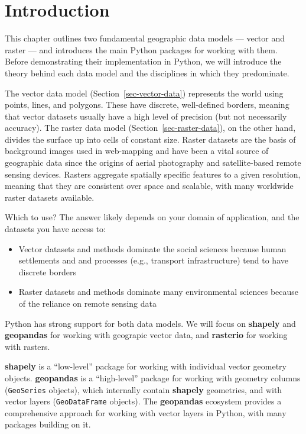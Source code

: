 \documentclass[
  letterpaper,
]{krantz}
\providecommand{\tightlist}{%
  \setlength{\itemsep}{0pt}\setlength{\parskip}{0pt}}\usepackage{longtable,booktabs,array}
\begin{document}
\section{Introduction}\label{introduction}

This chapter outlines two fundamental geographic data models --- vector
and raster --- and introduces the main Python packages for working with
them. Before demonstrating their implementation in Python, we will
introduce the theory behind each data model and the disciplines in which
they predominate.

The vector data model (Section~\ref{sec-vector-data}) represents the
world using points, lines, and polygons. These have discrete,
well-defined borders, meaning that vector datasets usually have a high
level of precision (but not necessarily accuracy). The raster data model
(Section~\ref{sec-raster-data}), on the other hand, divides the surface
up into cells of constant size. Raster datasets are the basis of
background images used in web-mapping and have been a vital source of
geographic data since the origins of aerial photography and
satellite-based remote sensing devices. Rasters aggregate spatially
specific features to a given resolution, meaning that they are
consistent over space and scalable, with many worldwide raster datasets
available.

Which to use? The answer likely depends on your domain of application,
and the datasets you have access to:

\begin{itemize}
\tightlist
\item
  Vector datasets and methods dominate the social sciences because human
  settlements and and processes (e.g., transport infrastructure) tend to
  have discrete borders
\item
  Raster datasets and methods dominate many environmental sciences
  because of the reliance on remote sensing data
\end{itemize}

Python has strong support for both data models. We will focus on
\textbf{shapely} and \textbf{geopandas} for working with geograpic
vector data, and \textbf{rasterio} for working with rasters.

\textbf{shapely} is a ``low-level'' package for working with individual
vector geometry objects. \textbf{geopandas} is a ``high-level'' package
for working with geometry columns (\texttt{GeoSeries} objects), which
internally contain \textbf{shapely} geometries, and with vector layers
(\texttt{GeoDataFrame} objects). The \textbf{geopandas} ecosystem
provides a comprehensive approach for working with vector layers in
Python, with many packages building on it.
\end{document}
